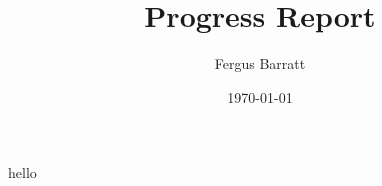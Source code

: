 \documentclass{article}
\title{Progress Report}
\author{Fergus Barratt}
\date{\today}
\begin{document}
  hello
  \cite{tag}
  
\end{document}
